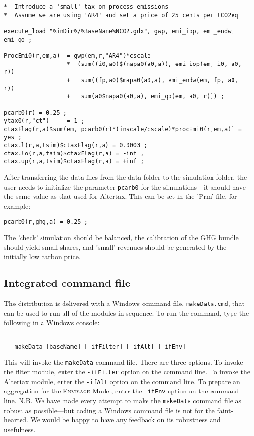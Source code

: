 \begin{lstlisting}[language=GAMS, caption={Initial pricing of process emissions in Altertax}, label=lst:pcarb0]
*  Introduce a 'small' tax on process emissions
*  Assume we are using 'AR4' and set a price of 25 cents per tCO2eq

execute_load "%inDir%/%BaseName%NCO2.gdx", gwp, emi_iop, emi_endw, emi_qo ;

ProcEmi0(r,em,a)  = gwp(em,r,"AR4")*cscale
                  *  (sum((i0,a0)$(mapa0(a0,a)), emi_iop(em, i0, a0, r))
                  +   sum((fp,a0)$mapa0(a0,a), emi_endw(em, fp, a0, r))
                  +   sum(a0$mapa0(a0,a), emi_qo(em, a0, r))) ;

pcarb0(r) = 0.25 ;
ytax0(r,"ct")     = 1 ;
ctaxFlag(r,a)$sum(em, pcarb0(r)*(inscale/cscale)*procEmi0(r,em,a)) = yes ;
ctax.l(r,a,tsim)$ctaxFlag(r,a) = 0.0003 ;
ctax.lo(r,a,tsim)$ctaxFlag(r,a) = -inf ;
ctax.up(r,a,tsim)$ctaxFlag(r,a) = +inf ;
\end{lstlisting}

After transferring the data files from the data folder to the
simulation folder, the user needs to initialize the
parameter \texttt{pcarb0} for the simulations---it should
have the same value as that used for Altertax. This can
be set in the 'Prm' file, for example:

\begin{verbatim}
pcarb0(r,ghg,a) = 0.25 ;
\end{verbatim}

The 'check' simulation should be balanced, the calibration
of the GHG bundle should yield small shares, and 'small' revenues
should be generated by the initially low carbon price.

\subsection{Integrated command file}

The distribution is delivered with a Windows command file,
\texttt{makeData.cmd}, that can be used to run all of the modules in sequence.
To run the command, type the following in a Windows console:

\begin{verbatim}

   makeData [baseName] [-ifFilter] [-ifAlt] [-ifEnv]

\end{verbatim}

\noindent This will invoke the \texttt{makeData} command file. There are three
options. To invoke the filter module, enter the \texttt{-ifFilter} option on the
command line. To invoke the Altertax module, enter the \texttt{-ifAlt} option on
the command line. To prepare an aggregation for the \textsc{Envisage} Model,
enter the \texttt{-ifEnv} option on the command line. N.B. We have made every
attempt to make the \texttt{makeData} command file as robust as possible---but
coding a Windows command file is not for the faint-hearted. We would be happy to
have any feedback on its robustness and usefulness.

